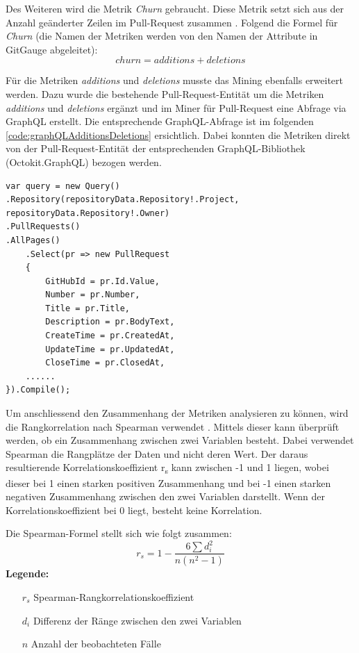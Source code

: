 Des Weiteren wird die Metrik \textit{Churn} gebraucht. Diese Metrik setzt sich aus der Anzahl geänderter Zeilen im Pull-Request zusammen \parencite{gousios_exploratory_2014}. Folgend die Formel für \textit{Churn} (die Namen der Metriken werden von den Namen der Attribute in GitGauge abgeleitet): 
\begin{equation}
churn = additions + deletions
\end{equation}

Für die Metriken \textit{additions} und \textit{deletions} musste das Mining ebenfalls erweitert werden. Dazu wurde die bestehende Pull-Request-Entität um die Metriken \textit{additions} und \textit{deletions} ergänzt und im Miner für Pull-Request eine Abfrage via GraphQL erstellt. Die entsprechende GraphQL-Abfrage ist im folgenden \autoref{code:graphQLAdditionsDeletions} ersichtlich. Dabei konnten die Metriken direkt von der Pull-Request-Entität der entsprechenden GraphQL-Bibliothek (Octokit.GraphQL) bezogen werden.


\begin{lstlisting}[language=CSharp, caption={GraphQL-Abfrage additions und deletions}, label={code:graphQLAdditionsDeletions}]
var query = new Query()
.Repository(repositoryData.Repository!.Project, repositoryData.Repository!.Owner)
.PullRequests()
.AllPages()
    .Select(pr => new PullRequest
    {
        GitHubId = pr.Id.Value,
        Number = pr.Number,
        Title = pr.Title,
        Description = pr.BodyText,
        CreateTime = pr.CreatedAt,
        UpdateTime = pr.UpdatedAt,
        CloseTime = pr.ClosedAt,
    ......
}).Compile();
\end{lstlisting}

Um anschliessend den Zusammenhang der Metriken analysieren zu können, wird die Rangkorrelation nach Spearman verwendet \parencite{noauthor_t-test_nodate}. Mittels dieser kann überprüft werden, ob ein Zusammenhang zwischen zwei Variablen besteht. Dabei verwendet Spearman die Rangplätze der Daten und nicht deren Wert. Der daraus resultierende Korrelationskoeffizient r\textsubscript{s} kann zwischen -1 und 1 liegen, wobei dieser bei 1 einen starken positiven Zusammenhang und bei -1 einen starken negativen Zusammenhang zwischen den zwei Variablen darstellt. Wenn der Korrelationskoeffizient bei 0 liegt, besteht keine Korrelation. \parencite{noauthor_t-test_nodate}


Die Spearman-Formel \parencite{noauthor_t-test_nodate} stellt sich wie folgt zusammen: 
\begin{equation}
r_s = 1 - \frac{6 \sum d_i^2}{n(n^2 - 1)}
\end{equation}
\label{eqn:spearman}
\noindent\textbf{Legende:}
\begin{itemize}
  \item [$r_s$] Spearman-Rangkorrelationskoeffizient
  \item[$d_i$] Differenz der Ränge zwischen den zwei Variablen 
  \item[$n$] Anzahl der beobachteten Fälle
\end{itemize}


